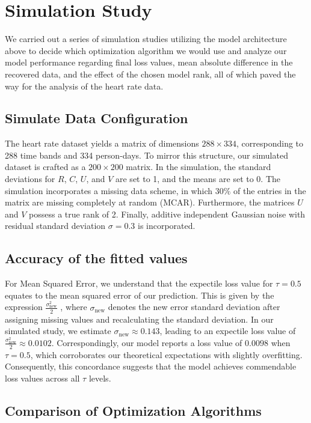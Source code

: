 \documentclass{article}
\begin{document}
\section{Simulation Study}
We carried out a series of simulation studies utilizing the model architecture above to decide which optimization algorithm we would use and analyze our model performance regarding final loss values, mean absolute difference in the recovered data, and the effect of the chosen model rank, all of which paved the way for the analysis of the heart rate data.

\subsection{Simulate Data Configuration}
The heart rate dataset yields a matrix of dimensions $288 \times 334$, corresponding to 288 time bands and 334 person-days. To mirror this structure, our simulated dataset is crafted as a $200 \times 200$ matrix. In the simulation, the standard deviations for $R$, $C$, $U$, and $V$ are set to 1, and the means are set to 0. The simulation incorporates a missing data scheme, in which $30\%$ of the entries in the matrix are missing completely at random (MCAR). Furthermore, the matrices $U$ and $V$ possess a true rank of 2. Finally, additive independent Gaussian noise with residual standard deviation $\sigma = 0.3$ is incorporated.

\subsection{Accuracy of the fitted values}

For Mean Squared Error, we understand that the expectile loss value for $\tau = 0.5$ equates to the mean squared error of our prediction. This is given by the expression $\displaystyle\frac{\sigma_{\text{new}}^2}{2}$ \cite{newey1987asymmetric}, where $\sigma_{\text{new}}$ denotes the new error standard deviation after assigning missing values and recalculating the standard deviation. In our simulated study, we estimate $\sigma_{\text{new}} \approx 0.143$, leading to an expectile loss value of $\displaystyle\frac{\sigma_{\text{new}}^2}{2} \approx 0.0102$. Correspondingly, our model reports a loss value of $0.0098$ when $\tau = 0.5$, which corroborates our theoretical expectations with slightly overfitting. Consequently, this concordance suggests that the model achieves commendable loss values across all $\tau$ levels. 

\subsection{Comparison of Optimization Algorithms}
\end{document}
